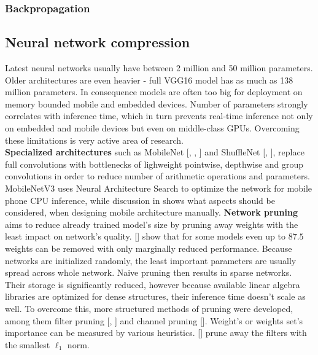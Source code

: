 \documentclass[../Main.tex]{subfiles}
\begin{document}
    \subsubsection{Backpropagation}

\subsection{Neural network compression}
    Latest neural networks usually have between 2 million and 50 million parameters.
    Older architectures are even heavier - full VGG16 model has as much as
    138 million parameters. In consequence models 
    are often too big for deployment on memory bounded mobile and embedded devices.
    Number of parameters strongly correlates with inference time, which in turn
    prevents real-time inference not only on embedded and mobile
    devices but even on middle-class GPUs. Overcoming these limitations 
    is very active area of research.\\
    \textbf{Specialized architectures} such as MobileNet [\cite{mobilenetv1},
    \cite{mobilenetv2}, \cite{mobilenetv3}] and ShuffleNet [\cite{shufflenetv1},
    \cite{shufflenetv2}], replace full convolutions with bottlenecks of lighweight
    pointwise, depthwise and group convolutions in order to reduce number of 
    arithmetic operations and parameters. MobileNetV3 \cite{mobilenetv3} uses
    Neural Architecture Search to optimize the network for mobile phone CPU
    inference, while discussion in \cite{shufflenetv2} shows what aspects should
    be considered, when designing mobile architecture manually. 
    \textbf{Network pruning} aims to reduce already trained model's size by pruning away
    weights with the least impact on network's quality. [\cite{zhu2017prune}] show
    that for some models even up to $87.5$ weights can be removed with only 
    marginally reduced performance. 
    Because networks are initialized randomly, the least
    important parameters are usually spread across whole network. Naive pruning 
    then results in sparse networks. Their storage is significantly reduced, however
    because available linear algebra libraries are optimized for dense structures,
    their inference time doesn't scale as well. To overcome this, more structured
    methods of pruning were developed, among them filter pruning [\cite{li2016pruning},
    \cite{molchanov2016pruning}]
    and channel pruning [\cite{he2017channel}]. 
    Weight's or weights set's importance can be measured by various heuristics. 
    [\cite{li2016pruning}] prune away the filters with the smallest $\ell_1$ norm.
\end{document}
